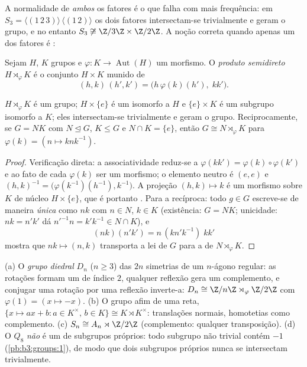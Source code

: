 A normalidade de \emph{ambos} os fatores é o que falha com mais
frequência: em $S_3
= \langle (1\,2\,3)\rangle \,\langle(1\,2)\rangle$ os dois fatores intersectam-se trivialmente e
geram o grupo, e no entanto $S_3 \not\cong \Z/3\Z \times
\Z/2\Z$. A noção correta quando apenas um dos
fatores é :

\begin{definition}\label{def:b3:groups:semidirect}
Sejam $H$, $K$ grupos e $\varphi \colon K \to
\operatorname{Aut}(H)$ um morfismo. O \emph{produto
semidireto} $H \rtimes_\varphi K$ é o conjunto $H \times K$ munido de
\[
(h, k)\,(h', k') = \bigl(h\,\varphi(k)(h'),\; kk'\bigr).
\]
\end{definition}

\begin{proposition}\label{prop:b3:groups:semidirect}
$H \rtimes_\varphi K$ é um grupo; $H \times \{e\}$ é um  isomorfo a $H$ e $\{e\} \times K$
é um subgrupo isomorfo a $K$; eles intersectam-se trivialmente e
geram o grupo. Reciprocamente, se $G =
NK$ com $N \trianglelefteq G$, $K \leq G$ e $N \cap K = \{e\}$,
então $G \cong N \rtimes_\varphi K$ para $\varphi(k) = (n \mapsto
knk^{-1})$.
\end{proposition}

\begin{proof}
Verificação direta: a associatividade reduz-se a $\varphi(kk') =
\varphi(k)\circ\varphi(k')$ e ao fato de
cada $\varphi(k)$ ser um morfismo; o elemento neutro é $(e,e)$ e $(h,k)^{-1} =
\bigl(\varphi(k^{-1})(h^{-1}), k^{-1}\bigr)$. A
projeção $(h,k)
\mapsto k$ é um morfismo sobre $K$ de núcleo $H \times \{e\}$, que é
portanto . Para a recíproca: todo $g \in G$ escreve-se de maneira
\emph{única} como $nk$ com $n \in N$, $k \in K$ (existência: $G =
NK$;
unicidade: $nk = n'k'$ dá $n'^{-1}n = k'k^{-1} \in N \cap
K$), e
\[
(nk)(n'k') = n\,(kn'k^{-1})\;kk'
\]
mostra que $nk \mapsto (n, k)$ transporta a lei de $G$ para a de $N \rtimes_\varphi K$.
\end{proof}

\begin{example}\label{ex:b3:groups:semidirectexamples}
(a) O \emph{grupo diedral} $D_n$ ($n \geq
3$) das
$2n$ simetrias de um $n$-ágono regular: as rotações formam um
 de índice $2$, qualquer reflexão gera um
complemento, e conjugar uma rotação por uma reflexão inverte-a: $D_n \cong \Z/n\Z \rtimes_\varphi \Z/2\Z$
com $\varphi(1) = (x
\mapsto -x)$.
(b) O grupo afim de uma reta, $\{x \mapsto ax + b : a \in
K^\times,\, b \in K\} \cong K \rtimes K^\times$: translações normais, homotetias
como complemento.
(c) $S_n \cong A_n \rtimes \Z/2\Z$ (complemento: qualquer transposição).
(d) O  $Q_8$ \emph{não} é um 
de subgrupos próprios: todo subgrupo não trivial contém $-1$
(\cref{pb:b3:groups:1}), de modo que dois subgrupos próprios nunca se
intersectam trivialmente.
\end{example}

